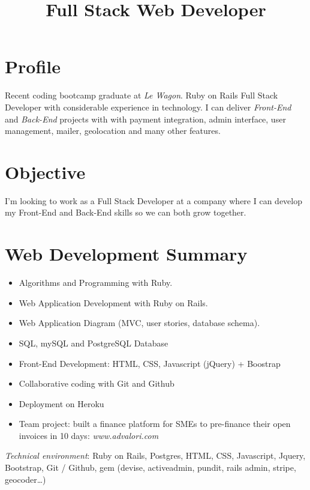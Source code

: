 \documentclass[11pt,a4paper]{moderncv}
\title{Full Stack Web Developer}
\newcommand{\pl}[1]{\textit{\color{plblue} #1}}
\begin{document}
\maketitle

\section{Profile}
Recent coding bootcamp graduate at \pl{Le Wagon}. Ruby on Rails Full Stack Developer with considerable experience in technology. I can deliver \pl{Front-End} and \pl{Back-End} projects with with payment integration, admin interface, user management, mailer, geolocation and many other features.

\section{Objective}
I'm looking to work as a Full Stack Developer at a company where I can develop my Front-End and Back-End skills so we can both grow together.

\section{Web Development Summary}
\begin{itemize}
\item Algorithms and Programming with Ruby.
\item Web Application Development with Ruby on Rails.
\item Web Application Diagram (MVC, user stories, database schema).
\item SQL, mySQL and PostgreSQL Database
\item Front-End Development: HTML, CSS, Javascript (jQuery) + Boostrap
\item Collaborative coding with Git and Github
\item Deployment on Heroku
\item Team project: built a finance platform for SMEs to pre-finance their open invoices in 10 days: \pl{www.advalori.com}
\end{itemize}

\pl{Technical environment}: Ruby on Rails, Postgres, HTML, CSS, Javascript, Jquery, Bootstrap, Git / Github, gem (devise, activeadmin, pundit, rails admin, stripe, geocoder…)
\end{document}
